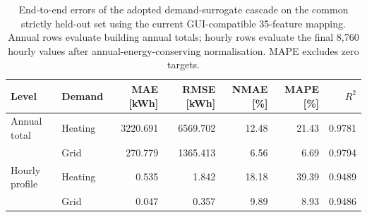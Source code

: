 \begin{table}[htbp]
\centering
\footnotesize
\caption{End-to-end errors of the adopted demand-surrogate cascade on the common strictly held-out set using the current GUI-compatible 35-feature mapping. Annual rows evaluate building annual totals; hourly rows evaluate the final 8,760 hourly values after annual-energy-conserving normalisation. MAPE excludes zero targets.}
\label{tab:adopted_demand_end_to_end}
\begin{tabular}{llrrrrr}
\toprule
Level & Demand & MAE [kWh] & RMSE [kWh] & NMAE [\%] & MAPE [\%] & $R^2$ \\
\midrule
Annual total & Heating & 3220.691 & 6569.702 & 12.48 & 21.43 & 0.9781 \\
 & Grid & 270.779 & 1365.413 & 6.56 & 6.69 & 0.9794 \\
\midrule
Hourly profile & Heating & 0.535 & 1.842 & 18.18 & 39.39 & 0.9489 \\
 & Grid & 0.047 & 0.357 & 9.89 & 8.93 & 0.9486 \\
\bottomrule
\end{tabular}
\end{table}
